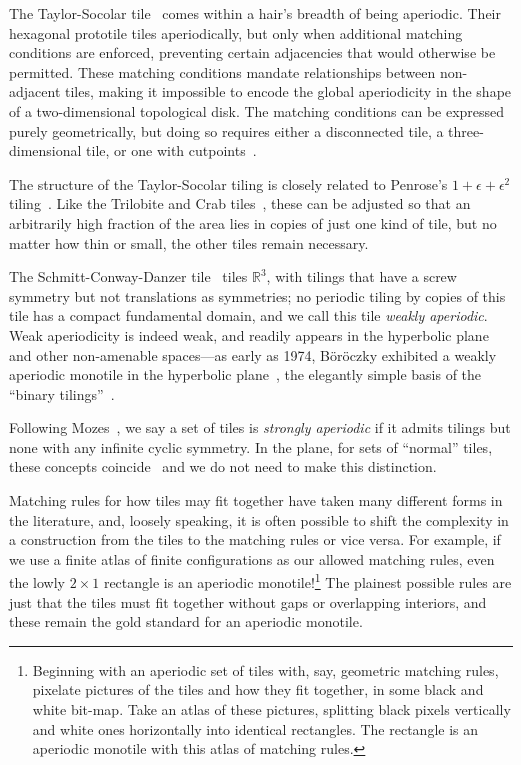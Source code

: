 The Taylor-Socolar tile~\cite{ST1} comes within a hair's breadth
of being aperiodic.  Their hexagonal prototile tiles
aperiodically, but only when additional matching conditions are enforced, 
preventing certain adjacencies that would otherwise be permitted.
These matching conditions mandate relationships
between non-adjacent tiles, making it impossible to encode 
the global aperiodicity in the shape of a two-dimensional topological
disk.  The matching conditions can be expressed
purely geometrically, but doing so requires either a disconnected tile, a
three-dimensional tile, or one with cutpoints~\cite{ST2}. 

The structure of the Taylor-Socolar
tiling is closely related to Penrose's $1+\epsilon+\epsilon^2$
tiling~\cite{penrose_epsilon}. Like the Trilobite and Crab tiles~\cite{ChaimTC}, these can be adjusted so that an arbitrarily high fraction of the area lies in copies of just one kind of tile, but no matter how thin or small, the other tiles remain  necessary. 

The Schmitt-Conway-Danzer tile~\cite[Section 7.2]{Senechal} tiles
$\mathbb{R}^3$, with tilings that have a screw symmetry but not
translations as symmetries; no periodic tiling by copies of this tile has a compact fundamental domain, and we call this tile \emph{weakly  aperiodic}. Weak aperiodicity  is indeed weak, and readily appears  in the hyperbolic plane and other non-amenable spaces---as early as 1974, B\"or\"oczky exhibited a weakly aperiodic monotile in the hyperbolic plane~\cite{Boroczsky}, the elegantly simple basis of the ``binary tilings''~\cite{BlockWeinberger,regprod,MargulisMozes,Mozes97}.

Following Mozes~\cite{Mozes97}, we say a set of tiles is \emph{strongly aperiodic} if it admits tilings but none with any infinite cyclic symmetry.  In the plane, for  sets of ``normal'' tiles,
these concepts coincide~\cite[Theorem~3.7.1]{GS} and we do not need to make this distinction.

Matching rules for how tiles may fit together have taken many different forms in the literature, and, loosely speaking, it is often possible to shift the complexity in a construction from the tiles to the matching rules or vice versa. For example, if we use a finite atlas of finite configurations as our allowed matching rules, even the lowly $2\times1$ rectangle is an aperiodic monotile!\footnote{Beginning with an aperiodic set of tiles with, say, geometric matching rules, pixelate pictures of the tiles and how they fit together, in some black and white bit-map. Take an atlas of these pictures, splitting black pixels vertically and white ones horizontally into identical rectangles. The rectangle is an aperiodic monotile with this atlas of matching rules.}
The plainest possible rules are just that the tiles must fit together without gaps or overlapping interiors, and these remain the gold standard for an aperiodic monotile.




